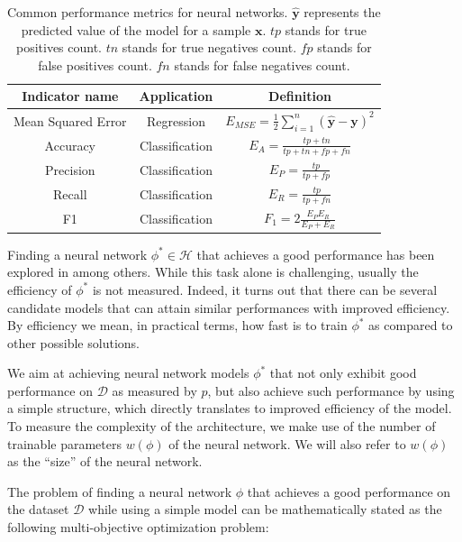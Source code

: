 \documentclass[preprint,12pt]{elsarticle}%
\begin{document}
\begin{table}[H]
\begin{center}
\begin{tabular}{| c | c | c |}
\hline
Indicator name & Application & Definition\\[2ex]
\hline
Mean Squared Error & Regression & $E_{MSE} = \frac{1}{2}\sum\limits_{i=1}^{n} \left( \mathbf{\hat{y}} - \mathbf{y} \right)^2$\\[2ex]
Accuracy & Classification & $E_{A} = \frac{tp+tn}{tp+tn + fp + fn}$ \\[2ex]
Precision & Classification & $E_{P} = \frac{tp}{tp+fp}$ \\[2ex]
Recall & Classification & $E_{R} = \frac{tp}{tp+fn}$\\[2ex]
F1 & Classification & $F_{1} = 2 \frac{E_{P} E_{R}}{E_{P} + E_{R}}$\\[2ex]
\hline
\end{tabular}
\end{center}
\caption{Common performance metrics for neural networks. $\mathbf{\hat{y}}$ represents the predicted value of the model for a sample $\mathbf{x}$. $tp$ stands for true positives count. $tn$ stands for true negatives count. $fp$ stands for false positives count. $fn$ stands for false negatives count.}
\label{table:performance_metrics}
\end{table}

Finding a neural network $\phi^* \in \mathcal{H}$ that achieves a good performance has been explored in \cite{AutoKeras2018,Real2018} among others. While this task alone is challenging, usually the efficiency of $\phi^*$ is not measured. Indeed, it turns out that there can be several candidate models that can attain similar performances with improved efficiency. By efficiency we mean, in practical terms, how fast is to train $\phi^*$ as compared to other possible solutions. 

We aim at achieving neural network models $\phi^*$ that not only exhibit good performance on $\mathcal{D}$ as measured by $p$, but also achieve such performance by using a simple structure, which directly translates to improved efficiency of the model. To measure the complexity of the architecture, we make use of the number of trainable parameters $w(\phi)$ of the neural network. We will also refer to $w(\phi)$ as the ``size'' of the neural network.

The problem of finding a neural network $\phi$ that achieves a good performance on the dataset $\mathcal{D}$ while using a simple model can be mathematically stated as the following multi-objective optimization problem:
\end{document}
